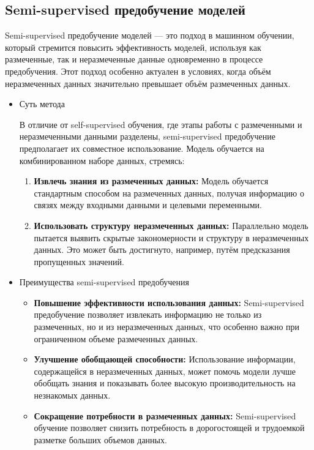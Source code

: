 \subsection{Semi-supervised предобучение моделей}
Semi-supervised предобучение моделей — это подход в машинном обучении, который стремится повысить эффективность моделей, используя как размеченные, так и неразмеченные данные одновременно в процессе предобучения.  Этот подход особенно актуален в условиях, когда объём неразмеченных данных значительно превышает объём размеченных данных.
\begin{itemize}
    \item Суть метода
    
    В отличие от self-supervised обучения, где этапы работы с размеченными и неразмеченными данными разделены, semi-supervised предобучение предполагает их совместное использование. Модель обучается  на  комбинированном наборе данных,  стремясь:

    \begin{enumerate}
        \item \textbf{Извлечь знания из размеченных данных:} Модель обучается стандартным способом на размеченных данных, получая информацию о связях между входными данными и целевыми переменными.
        \item \textbf{Использовать структуру неразмеченных данных:} Параллельно модель пытается выявить скрытые закономерности и структуру в неразмеченных данных.  Это может быть достигнуто, например, путём предсказания пропущенных значений.
    \end{enumerate}

    \item{Преимущества semi-supervised предобучения}

    \begin{itemize}
        \item \textbf{Повышение эффективности использования данных:} Semi-supervised предобучение позволяет извлекать информацию не только из  размеченных,  но  и  из  неразмеченных  данных,  что  особенно  важно  при  ограниченном  объеме  размеченных  данных.
        \item \textbf{Улучшение обобщающей способности:} Использование  информации,  содержащейся  в  неразмеченных  данных,  может  помочь  модели  лучше  обобщать  знания  и  показывать  более  высокую  производительность  на  незнакомых  данных.
        \item \textbf{Сокращение потребности в размеченных данных:} Semi-supervised обучение  позволяет  снизить  потребность  в  дорогостоящей  и  трудоемкой  разметке  больших  объемов  данных.
    \end{itemize}

\end{itemize}
